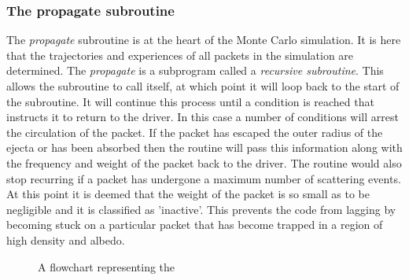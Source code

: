 		\subsubsection{The propagate subroutine}
		The \textit{propagate} subroutine is at the heart of the Monte Carlo simulation.  It is here that the trajectories and experiences of all packets in the simulation are determined.  The \textit{propagate} is a subprogram called a \textit{recursive subroutine}.  This allows the subroutine to call itself, at which point it will loop back to the start of the subroutine.  It will continue this process until a condition is reached that instructs it to return to the driver.  In this case a number of conditions will arrest the circulation of the packet. If the packet has escaped the outer radius of the ejecta or has been absorbed then the routine will pass this information along with the frequency and weight of the packet back to the driver.  The routine would also stop recurring if a packet has undergone a maximum number of scattering events.  At this point it is deemed that the weight of the packet is so small as to be negligible and it is classified as 'inactive'.  This prevents the code from lagging by becoming stuck on a particular packet that has become trapped in a region of high density and albedo. 
		
		\begin{centering}
            	\begin{figure}
            	\caption{A flowchart representing the }
            	\label{fig:flowchart_propagate}
            	\end{figure}
            	\end{centering}
		
